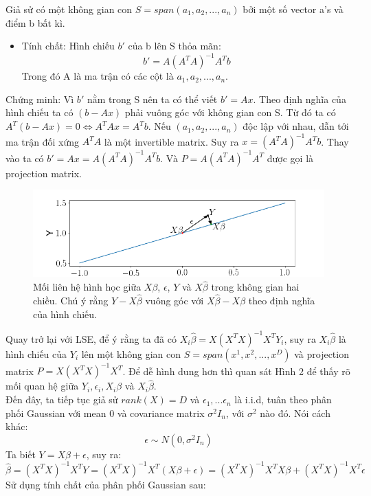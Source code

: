 \documentclass[10pt]{article}
\begin{document}
\begin{enumerate}
Giả sử có một không gian con $S=span(a_1, a_2,...,a_n)$ bởi một số vector a's và điểm b bất kì.
\begin{itemize}

\item Tính chất: Hình chiếu $b'$ của b lên S thỏa mãn:
\[b' = A(A^{T}A)^{-1}A^{T}b \] 
Trong đó A là ma trận có các cột là $a_1, a_2,...,a_n$.

\end{itemize}
Chứng minh: Vì $b'$ nằm trong S nên ta có thể viết $b'=Ax$. Theo định nghĩa của hình chiếu ta có $(b-Ax)$ phải vuông góc với không gian con S. Từ đó ta có $A^{T}(b-Ax)=0 \Longleftrightarrow A^{T}Ax = A^{T}b$. Nếu $(a_1, a_2,...,a_n)$ độc lập với nhau, dẫn tới ma trận đối xứng $A^{T}A$ là một invertible matrix. Suy ra $x=(A^{T}A)^{-1}A^{T}b$. Thay vào ta có $b'=Ax=A(A^{T}A)^{-1}A^{T}b$. Và $P = A(A^{T}A)^{-1}A^{T}$ được gọi là projection matrix.\\
\begin{figure}
  \includegraphics[width=\linewidth]{least_square.png}
  \caption{ Mối liên hệ hình học giữa $X\beta$, $\epsilon$, $Y$ và $X\hat{\beta}$ trong không gian hai chiều. Chú ý rằng $Y-X\hat{\beta}$ vuông góc với $X\hat{\beta} - X\beta$ theo định nghĩa của hình chiếu.}
  \label{fig:boat1}
\end{figure}
Quay trở lại với LSE, để ý rằng ta đã có $X_i\hat{\beta} = X(X^{T}X)^{-1}X^{T}Y_i$, suy ra $X_i\hat{\beta}$ là hình chiếu của $Y_i$ lên một không gian con $S=span(x^{1}, x^{2},...,x^{D})$ và projection matrix $P=X(X^{T}X)^{-1}X^{T}$. Để dễ hình dung hơn thì quan sát Hình 2 để thấy rõ mối quan hệ giữa $Y_i, \epsilon_i, X_i\beta$ và $X_i\hat{\beta}$.\\

Đến đây, ta tiếp tục giả sử $rank(X)=D$ và $\epsilon_1,...\epsilon_n$ là i.i.d, tuân theo phân phối Gaussian với mean 0 và covariance matrix $\sigma^2I_n$, với $\sigma^2$ nào đó. Nói cách khác: 
\[\epsilon \sim N(0, \sigma^2I_n) \]
Ta biết $Y=X\beta + \epsilon$, suy ra:
\[ \hat{\beta} = (X^{T}X)^{-1}X^{T}Y=(X^{T}X)^{-1}X^{T}(X\beta + \epsilon) = (X^{T}X)^{-1}X^{T}X\beta + (X^{T}X)^{-1}X^{T}\epsilon \tag{2}\]
Sử dụng tính chất của phân phối Gaussian sau:
\begin{itemize}


\end{itemize}
\end{enumerate}
\end{document}
